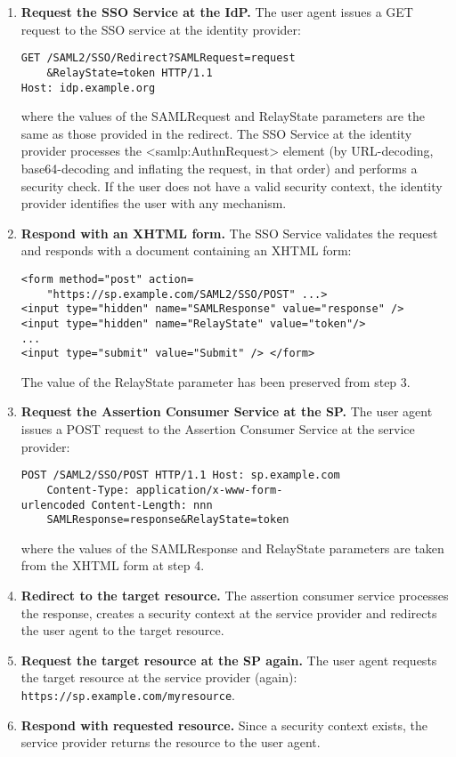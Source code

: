 \documentclass[a4paper, 10pt, titlepage]{article}
\begin{document}
\begin{enumerate}
\item \textbf{Request the SSO Service at the IdP.} The user agent issues a GET request to the SSO service at the identity provider:
\begin{lstlisting}
GET /SAML2/SSO/Redirect?SAMLRequest=request
	&RelayState=token HTTP/1.1
Host: idp.example.org
\end{lstlisting}
where the values of the SAMLRequest and RelayState parameters are the same as those provided in the redirect. The SSO Service at the identity provider processes the <samlp:AuthnRequest> element (by URL-decoding, base64-decoding and inflating the request, in that order) and performs a security check. If the user does not have a valid security context, the identity provider identifies the user with any mechanism.
\item \textbf{Respond with an XHTML form.} The SSO Service validates the request and responds with a document containing an XHTML form:
\begin{lstlisting}
<form method="post" action=
	"https://sp.example.com/SAML2/SSO/POST" ...> 
<input type="hidden" name="SAMLResponse" value="response" /> 
<input type="hidden" name="RelayState" value="token"/> 
... 
<input type="submit" value="Submit" /> </form>
\end{lstlisting}
The value of the RelayState parameter has been preserved from step 3.
\item \textbf{Request the Assertion Consumer Service at the SP.} The user agent issues a POST request to the Assertion Consumer Service at the service provider:
\begin{lstlisting}
POST /SAML2/SSO/POST HTTP/1.1 Host: sp.example.com 
	Content-Type: application/x-www-form-
urlencoded Content-Length: nnn 
	SAMLResponse=response&RelayState=token
\end{lstlisting}
where the values of the SAMLResponse and RelayState parameters are taken from the XHTML form at step 4.
\item \textbf{Redirect to the target resource.} The assertion consumer service processes the response, creates a security context at the service provider and redirects the user agent to the target resource.
\item \textbf{Request the target resource at the SP again.} The user agent requests the target resource at the service provider (again): \lstinline|https://sp.example.com/myresource|.
\item \textbf{Respond with requested resource.} Since a security context exists, the service provider returns the resource to the user agent.
\end{enumerate}
\end{document}
